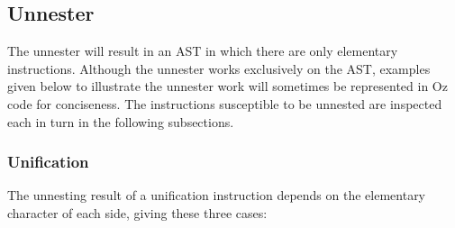 \documentclass[a4paper]{memoir}
\begin{document}
\subsection{Unnester}            
The unnester will result in an AST in which there are only elementary instructions. Although the unnester works exclusively on the AST, examples given below to illustrate the unnester work will sometimes be represented in Oz code for conciseness.  The instructions susceptible to be unnested are inspected each in turn in the following subsections.
\subsubsection{Unification}\label{sec:unnester:unification}
The unnesting result of a unification instruction depends on the elementary character of each side, giving these three cases:
\end{document}
